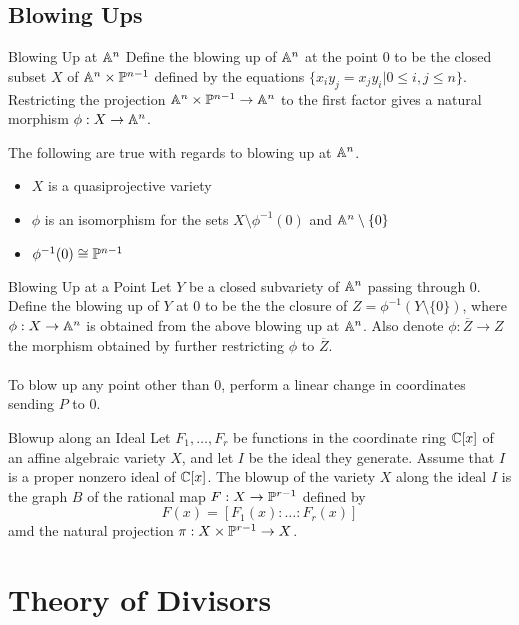 \documentclass[a4paper]{article}
\begin{document}
\subsection{Blowing Ups}
\begin{defn}{Blowing Up at $\mathbb{A}^n$}{} Define the blowing up of $\mathbb{A}^n$ at the point $0$ to be the closed subset $X$ of $\mathbb{A}^n\times\mathbb{P}^{n-1}$ defined by the equations $\{x_iy_j=x_jy_i|0\leq i,j\leq n\}$. Restricting the projection $\mathbb{A}^n\times\mathbb{P}^{n-1}\to\mathbb{A}^n$ to the first factor gives a natural morphism $\phi:X\to\mathbb{A}^n$. 
\end{defn}

\begin{thm}{}{} The following are true with regards to blowing up at $\mathbb{A}^n$. 
\begin{itemize}
\item $X$ is a quasiprojective variety
\item $\phi$ is an isomorphism for the sets $X\setminus\phi^{-1}(0)$ and $\mathbb{A}^n\setminus\{0\}$
\item $\phi^{-1}(0)\cong\mathbb{P}^{n-1}$
\end{itemize}
\end{thm}

\begin{defn}{Blowing Up at a Point}{} Let $Y$ be a closed subvariety of $\mathbb{A}^n$ passing through $0$. Define the blowing up of $Y$ at $0$ to be the the closure of $Z=\phi^{-1}(Y\setminus\{0\})$, where $\phi:X\to\mathbb{A}^n$ is obtained from the above blowing up at $\mathbb{A}^n$. Also denote $\phi:\overline{Z}\to Z$ the morphism obtained by further restricting $\phi$ to $\overline{Z}$. \\~\\
To blow up any point other than $0$, perform a linear change in coordinates sending $P$ to $0$. 
\end{defn}

\begin{defn}{Blowup along an Ideal}{} Let $F_1,\dots,F_r$ be functions in the coordinate ring $\mathbb{C}[x]$ of an affine algebraic variety $X$, and let $I$ be the ideal they generate. Assume that $I$ is a proper nonzero ideal of $\mathbb{C}[x]$. The blowup of the variety $X$ along the ideal $I$ is the graph $B$ of the rational map $F:X\to\mathbb{P}^{r-1}$ defined by $$F(x)=[F_1(x):\dots:F_r(x)]$$ amd the natural projection $\pi:X\times\mathbb{P}^{r-1}\to X$. 
\end{defn}

\pagebreak
\section{Theory of Divisors}
\end{document}
